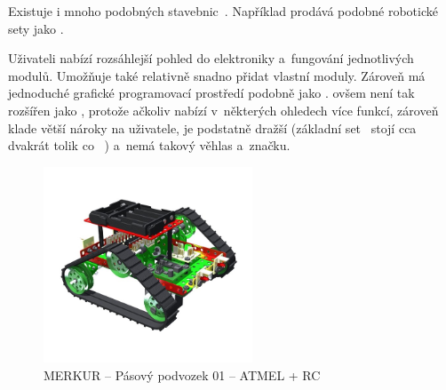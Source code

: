 
Existuje i mnoho podobných stavebnic~\cite{intorobotics_BestAlternativesToLegoMindstormsKits}. 
Například \fischerT prodává podobné robotické sety jako \lego{~}\cite{fischertechnik_ROBOTICS}. 

Uživateli nabízí rozsáhlejší pohled do elektroniky a~fungování jednotlivých modulů. 
Umožňuje také relativně snadno přidat vlastní moduly.
Zároveň má jednoduché grafické programovací prostředí podobně jako \lego. 
\FischerT{ }ovšem není tak rozšířen jako \legoM, protože ačkoliv nabízí v~některých ohledech více funkcí, zároveň klade větší nároky na uživatele, je podstatně dražší (základní set~\cite{fischertechnik_HelagoEshop_ROBOTICS-TXT-COMPETITION-SET} stojí cca dvakrát tolik co ~\cite{lego_eduxeEshop_CoreSet}) a~nemá takový věhlas a~značku.



\begin{figure}[h]
	\centering
	\includegraphics[width=235px]{images/MERKUR_Pasovy-podvozek-01_ATMEL+RC.jpg}
	\caption[MERKUR -- Pásový podvozek 01 -- ATMEL + RC]{MERKUR -- Pásový podvozek 01 -- ATMEL + RC\protect\footnotemark}
	\label{fig:MERKUR_Pasovy-podvozek-01_ATMEL+RC}
\end{figure}

